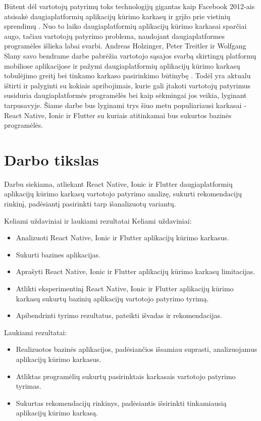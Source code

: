\documentclass{VUMIFInfBakalaurinis}
\begin{document}
Būtent dėl vartotojų patyrimų toks technologijų gigantas kaip Facebook 2012-ais atsisakė daugiaplatformių aplikacijų kūrimo karkasų ir grįžo prie vietinių sprendimų \cite{facebook}. Nuo to laiko daugiaplatformių aplikacijų kūrimo karkasai sparčiai augo, tačiau vartotojų patyrimo problema, naudojant daugiaplatformes programėles išlieka labai svarbi. Andreas Holzinger, Peter Treitler ir Wolfgang Slany savo bendrame darbe pabrėžia vartotojo sąsajos svarbą skirtingų platformų mobiliose aplikacijose ir pažymi daugiaplatformių aplikacijų kūrimo karkasų tobulėjimo greitį bei tinkamo karkaso pasirinkimo būtinybę \cite{usable}. Todėl yra aktualu ištirti ir palyginti su kokiais apribojimais, kurie gali įtakoti vartotojų patyrimus susiduria daugiaplatformės programėlės bei kaip sėkmingai jos veikia, lyginant tarpusavyje. Šiame darbe bus lyginami trys šiuo metu populiariausi karkasai - React Native, Ionic ir Flutter \cite{popularframeworks} su kuriais atitinkamai bus sukurtos bazinės programėlės.

\section{Darbo tikslas}
Darbu siekiama, atliekant React Native, Ionic ir Flutter daugiaplatformių aplikacijų kūrimo karkasų vartotojo patyrimo analizę, sukurti rekomendacijų rinkinį, padėsiantį pasirinkti tarp išanalizuotų variantų.

\begin {section}{Keliami uždaviniai ir laukiami rezultatai}
Keliami uždaviniai:
\begin{itemize}
  \item Analizuoti React Native, Ionic ir Flutter aplikacijų kūrimo karkasus.
  \item Sukurti bazines aplikacijas.
  \item Aprašyti React Native, Ionic ir Flutter aplikacijų kūrimo karkasų limitacijas.
  \item Atlikti eksperimentinį React Native, Ionic ir Flutter aplikacijų kūrimo karkasų sukurtų bazinių aplikacijų vartotojo patyrimo tyrimą.
  \item Apibendrinti tyrimo rezultatus, pateikti išvadas ir rekomendacijas.
\end{itemize}

Laukiami rezultatai:
\begin{itemize}
  \item Realizuotos bazinės aplikacijos, padėsiančios išsamiau suprasti, analizuojamus aplikacijų kūrimo karkasus.
  \item Atliktas programėlių sukurtų pasirinktais karkasais vartotojo patyrimo tyrimas.
  \item Sukurtas rekomendacijų rinkinys, padėsiantis išsirinkti tinkamiausią aplikacijų kūrimo karkasą.
\end{itemize}

\end{section}
\end{document}
